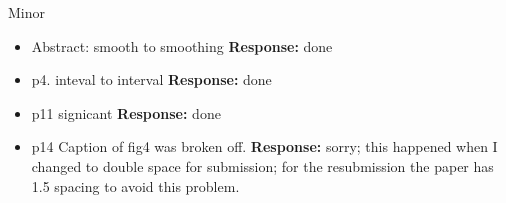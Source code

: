 \documentclass[12pt]{article}
\begin{document}
Minor



\begin{itemize}

\item Abstract: smooth to smoothing   \textbf{Response:} done

\item p4. inteval to interval  \textbf{Response:} done

\item p11 signicant   \textbf{Response:} done

\item p14 Caption of fig4 was broken off.  \textbf{Response:} sorry;
this happened when I changed to double space for submission; for the
resubmission the paper has 1.5 spacing to avoid this problem.

\end{itemize}
\end{document}
